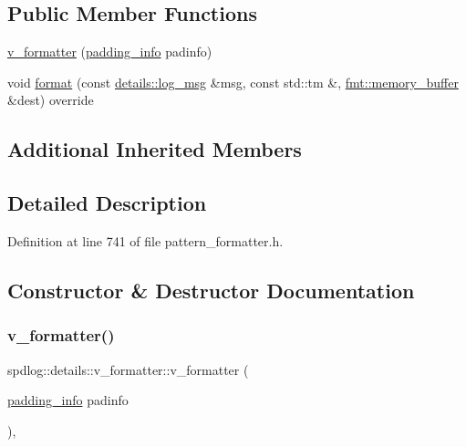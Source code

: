\subsection*{Public Member Functions}
\begin{DoxyCompactItemize}
\item 
\hyperlink{classspdlog_1_1details_1_1v__formatter_a54e77c3b682da6b1417f6a2adb23b018}{v\+\_\+formatter} (\hyperlink{structspdlog_1_1details_1_1padding__info}{padding\+\_\+info} padinfo)
\item 
void \hyperlink{classspdlog_1_1details_1_1v__formatter_af794a57051f743266fdb6ccf7fd6c61f}{format} (const \hyperlink{structspdlog_1_1details_1_1log__msg}{details\+::log\+\_\+msg} \&msg, const std\+::tm \&, \hyperlink{format_8h_a21cbf729f69302f578e6db21c5e9e0d2}{fmt\+::memory\+\_\+buffer} \&dest) override
\end{DoxyCompactItemize}
\subsection*{Additional Inherited Members}


\subsection{Detailed Description}


Definition at line 741 of file pattern\+\_\+formatter.\+h.



\subsection{Constructor \& Destructor Documentation}
\mbox{\label{classspdlog_1_1details_1_1v__formatter_a54e77c3b682da6b1417f6a2adb23b018}} 
\subsubsection{\texorpdfstring{v\+\_\+formatter()}{v\_formatter()}}
{\footnotesize\ttfamily spdlog\+::details\+::v\+\_\+formatter\+::v\+\_\+formatter (\begin{DoxyParamCaption}\item[{\hyperlink{structspdlog_1_1details_1_1padding__info}{padding\+\_\+info}}]{padinfo }\end{DoxyParamCaption})\hspace{0.3cm}{\ttfamily [inline]}, {\ttfamily [explicit]}}



